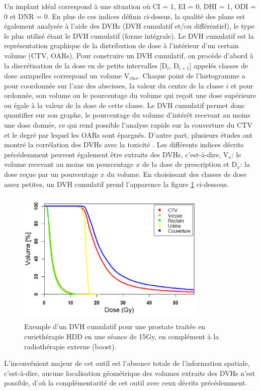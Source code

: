 Un implant idéal correspond à une situation où CI = 1, EI = 0, DHI = 1, ODI = 0 et DNR = 0. En plus de ces indices définis ci-dessus, la qualité des plans est également analysée à l’aide des DVHs (DVH cumulatif et/ou différentiel), le type le plus utilisé étant le DVH cumulatif (forme intégrale). Le DVH cumulatif est la représentation graphique de la distribution de dose à l’intérieur d’un certain volume (CTV, OARs). Pour construire un DVH cumulatif, on procède d’abord à la discrétisation de la dose en de petits intervalles [D$_{i}$, D$_{i+1}$] appelés classes de dose auxquelles correspond un volume V$_{clas}$. Chaque point de l’histogramme a pour coordonnée sur l’axe des abscisses, la valeur du centre de la classe $i$ et pour ordonnée, son volume ou le pourcentage du volume qui reçoit une dose supérieure ou égale à la valeur de la dose de cette classe. Le DVH cumulatif permet donc quantifier sur son graphe, le pourcentage du volume d’intérêt recevant au moins une dose donnée, ce qui rend possible l’analyse rapide sur la couverture du CTV et le degré par lequel les OARs sont épargnés. D’autre part, plusieurs études ont montré la corrélation des DVHs avec la toxicité \cite{Fiorino, Rodrigues, Taussky, Geinitz}.  Les différents indices décrits précédemment peuvent également être extraits des DVHs, c’est-à-dire, V$_{x}$: le volume recevant au moins un pourcentage $x$ de la dose de prescription et D$_{x}$: la dose reçue par un pourcentage $x$ du volume. En choisissant des classes de dose assez petites, un DVH cumulatif prend l’apparence la figure \ref{DVH}  ci-dessous.
%
\begin{figure}[!ht]
\centering
\includegraphics[width=9.0cm, height=6.5cm]{DVH.eps}
\caption{\label{DVH}Exemple d’un DVH cumulatif pour une prostate traitée en curiethérapie HDD en une séance de 15Gy, en complément à la radiothérapie externe (boost).}
\end{figure}
%
L’inconvénient majeur de cet outil est l’absence totale de l’information spatiale, c’est-à-dire, aucune localisation géométrique des volumes extraits des DVHs n’est possible, d’où la complémentarité de cet outil avec ceux décrits précédemment.
%
\newpage
